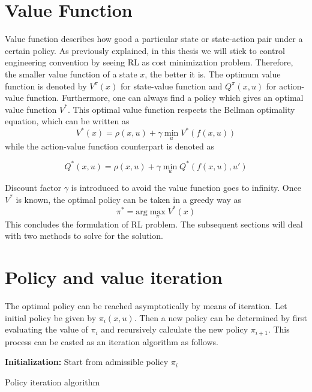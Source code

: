 \section{Value Function} \label{sec:value}
Value function describes how good a particular state or state-action pair under a certain policy. As previously explained, in this thesis we will stick to control engineering convention by seeing \ac{RL} as cost minimization problem. Therefore, the smaller value function of a state $x$, the better it is. The optimum value function is denoted by $ V^{\pi}(x) $ for state-value function and $ Q^{\pi}(x,u) $ for action-value function. Furthermore, one can always find a policy which gives an optimal value function $V^*$. This optimal value function respects the Bellman optimality equation, which can be written as 
\begin{equation}
V^*(x) = \rho(x,u) + \gamma \min_{u} V^*(f(x,u))
\label{eq:bellman}
\end{equation}
while the action-value function counterpart is denoted as

\begin{equation}
Q^*(x,u) = \rho(x,u) + \gamma \min_{u} Q^*(f(x,u),u')
\label{eq:bellman2}
\end{equation}

Discount factor $\gamma$ is introduced to avoid the value function goes to infinity. Once $V^*$ is known, the optimal policy can be taken in a greedy way as
\begin{equation}
\pi^* = \text{arg} \max_{\pi} V^*(x)
\label{eq:optPi}
\end{equation}
This concludes the formulation of \ac{RL} problem. The subsequent sections will deal with two methods to solve for the solution.

\section{Policy and value iteration} \label{sec:value_iter}
The optimal policy can be reached asymptotically by means of iteration. Let initial policy be given by $ \pi_i(x,u) $. Then a new policy can be determined by first evaluating the value of $ \pi_i $ and recursively calculate the new policy $ \pi_{i+1} $. This process can be casted as an iteration algorithm as follows.

\begin{algorithm}[H]
	\textbf{Initialization:} Start from admissible policy $ \pi_{i} $\\
\caption{Policy iteration algorithm}
\end{algorithm}


